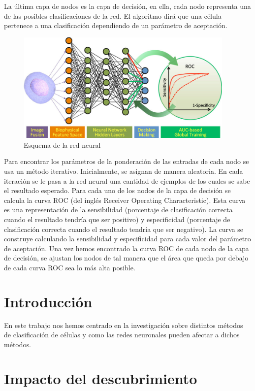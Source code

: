 \documentclass[a4paper, 12pt, UTF8]{article}
\begin{document}
La última capa de nodos es la capa de decisión, en ella, cada nodo representa una de las posibles clasificaciones de la red. El algoritmo dirá que una célula pertenece a una clasificación dependiendo de un parámetro de aceptación.

\begin{figure}[h!]
	\centering
	\includegraphics[width=0.95\textwidth]{neural}
	\caption{Esquema de la red neural}
	\label{fig:neural}
\end{figure}

Para encontrar los parámetros de la ponderación de las entradas de cada nodo se usa un método iterativo. Inicialmente, se asignan de manera aleatoria. En cada iteración se le pasa a la red neural una cantidad de ejemplos de los cuales se sabe el resultado esperado. Para cada uno de los nodos de la capa de decisión se calcula la curva ROC (del inglés Receiver Operating Characteristic). Esta curva es una representación de la sensibilidad (porcentaje de clasificación correcta cuando el resultado tendría que ser positivo) y especificidad (porcentaje de clasificación correcta cuando el resultado tendría que ser negativo). La curva se construye calculando la sensibilidad y especificidad para cada valor del parámetro de aceptación. Una vez hemos encontrado la curva ROC de cada nodo de la capa de decisión,  se ajustan los nodos de tal manera que el área que queda por debajo de cada curva ROC sea lo más alta posible.


\section{Introducción}

En este trabajo nos hemos centrado en la investigación\cite{deepLearning} sobre distintos métodos de clasificación de células y como las redes neuronales pueden afectar a dichos métodos.

\section{Impacto del descubrimiento}
\end{document}
